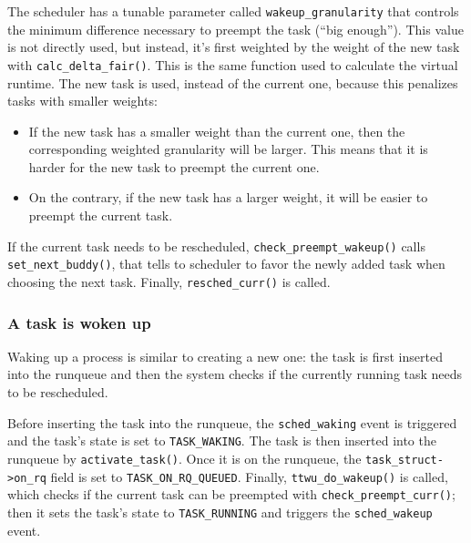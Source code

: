 The scheduler has a tunable parameter called \verb|wakeup_granularity| that controls the minimum difference necessary to preempt the task (``big enough''). This value is not directly used, but instead, it's first weighted by the weight of the new task with \verb|calc_delta_fair()|. This is the same function used to calculate the virtual runtime. The new task is used, instead of the current one, because this penalizes tasks with smaller weights:
\begin{itemize}
    \item If the new task has a smaller weight than the current one, then the corresponding weighted granularity will be larger. This means that it is harder for the new task to preempt the current one.
    
    \item On the contrary, if the new task has a larger weight, it will be easier to preempt the current task. 
\end{itemize}

If the current task needs to be rescheduled, \verb|check_preempt_wakeup()| calls \verb|set_next_buddy()|, that tells to scheduler to favor the newly added task when choosing the next task. Finally, \verb|resched_curr()| is called.

\subsubsection{A task is woken up}

Waking up a process is similar to creating a new one: the task is first inserted into the runqueue and then the system checks if the currently running task needs to be rescheduled.

Before inserting the task into the runqueue, the \verb|sched_waking|\label{trace:sched_waking} event is triggered and the task's state is set to \verb|TASK_WAKING|. The task is then inserted into the runqueue by \verb|activate_task()|. Once it is on the runqueue, the \verb|task_struct->on_rq| field  is set to \verb|TASK_ON_RQ_QUEUED|. Finally, \verb|ttwu_do_wakeup()| is called, which checks if the current task can be preempted with \verb|check_preempt_curr()|; then it sets the task's state to \verb|TASK_RUNNING| and triggers the \verb|sched_wakeup|\label{trace:sched_wakeup} event.

